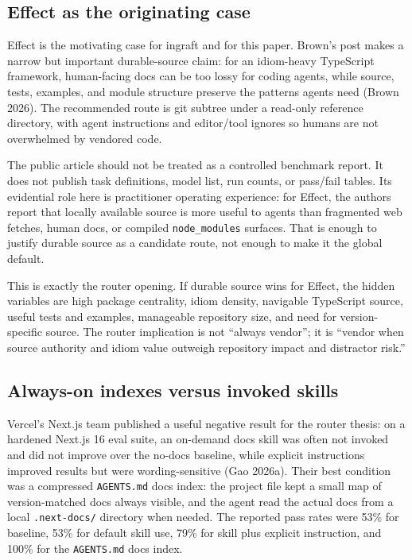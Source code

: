\documentclass[
  11pt,
  letterpaper,
  numbers=noendperiod,
  parskip=half]{scrartcl}
\begin{document}
\subsection{Effect as the originating case}\label{sec-effect-origin}

Effect is the motivating case for ingraft and for this paper. Brown's
post makes a narrow but important durable-source claim: for an
idiom-heavy TypeScript framework, human-facing docs can be too lossy for
coding agents, while source, tests, examples, and module structure
preserve the patterns agents need (Brown 2026). The recommended route is
git subtree under a read-only reference directory, with agent
instructions and editor/tool ignores so humans are not overwhelmed by
vendored code.

The public article should not be treated as a controlled benchmark
report. It does not publish task definitions, model list, run counts, or
pass/fail tables. Its evidential role here is practitioner operating
experience: for Effect, the authors report that locally available source
is more useful to agents than fragmented web fetches, human docs, or
compiled \texttt{node\_modules} surfaces. That is enough to justify
durable source as a candidate route, not enough to make it the global
default.

This is exactly the router opening. If durable source wins for Effect,
the hidden variables are high package centrality, idiom density,
navigable TypeScript source, useful tests and examples, manageable
repository size, and need for version-specific source. The router
implication is not ``always vendor''; it is ``vendor when source
authority and idiom value outweigh repository impact and distractor
risk.''

\subsection{Always-on indexes versus invoked
skills}\label{sec-agents-md-evals}

Vercel's Next.js team published a useful negative result for the router
thesis: on a hardened Next.js 16 eval suite, an on-demand docs skill was
often not invoked and did not improve over the no-docs baseline, while
explicit instructions improved results but were wording-sensitive (Gao
2026a). Their best condition was a compressed \texttt{AGENTS.md} docs
index: the project file kept a small map of version-matched docs always
visible, and the agent read the actual docs from a local
\texttt{.next-docs/} directory when needed. The reported pass rates were
53\% for baseline, 53\% for default skill use, 79\% for skill plus
explicit instruction, and 100\% for the \texttt{AGENTS.md} docs index.
\end{document}
